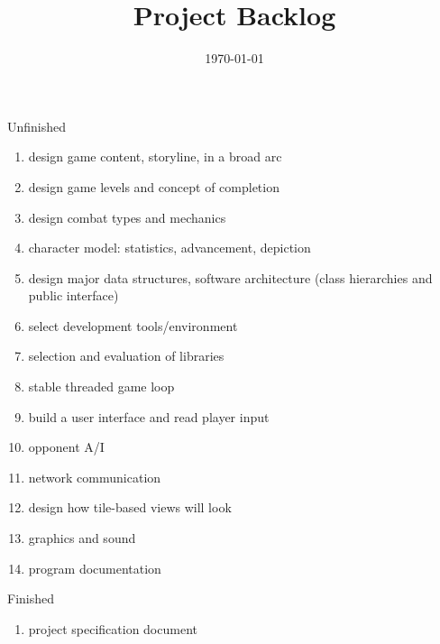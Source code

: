 \documentclass[12pt]{article}
\title{Project Backlog}
\date{\today}
\begin{document}
\maketitle

\begin{section}{Unfinished}
\begin{enumerate}
\item design game content, storyline, in a broad arc
\item design game levels and concept of completion
\item design combat types and mechanics
\item character model: statistics, advancement, depiction
\item design major data structures, software architecture (class
	hierarchies and public interface)
\item select development tools/environment
\item selection and evaluation of libraries
\item stable threaded game loop
\item build a user interface and read player input
\item opponent A/I
\item network communication
\item design how tile-based views will look
\item graphics and sound
\item program documentation
\end{enumerate}
\end{section}

\begin{section}{Finished}
\begin{enumerate}
\item project specification document
\end{enumerate}
\end{section}
\end{document}
